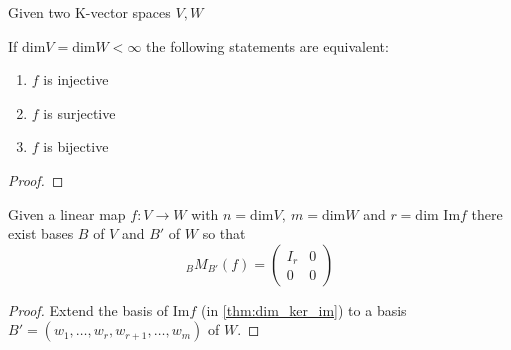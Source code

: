 \begin{corollary}
   Given two K-vector spaces \(V, W\)

   If \(\text{dim}V = \text{dim}W < \infty\) the following statements are equivalent:
   \begin{enumerate}
      \item \(f\) is injective
      \item \(f\) is surjective
      \item \(f\) is bijective
   \end{enumerate}
\end{corollary}
\begin{proof}
\end{proof}

\begin{corollary}\label{cor:transmat_optimal_basis}
   Given a linear map \(f: V \to W\) with \(n = \text{dim}V,~m = \text{dim}W\) and \(r = \text{dim Im}f\) there exist bases \(B\) of \(V\) and \(B'\) of \(W\) so that
  \[{}_{B}M_{B'}(f) = \begin{pmatrix}I_r & 0 \\ 0 & 0\end{pmatrix}\]
\end{corollary}
\begin{proof}
   Extend the basis of \(\text{Im}f\) (in \cref{thm:dim_ker_im}) to a basis \(B' = (w_1, \ldots, w_r, w_{r+1}, \ldots, w_m)\) of \(W\).
\end{proof}
